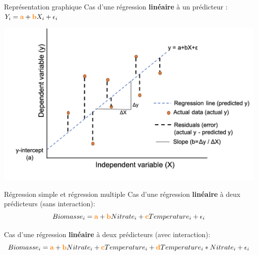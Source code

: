 	
	\begin{frame}{Représentation graphique}
	Cas d'une régression \textbf{linéaire} à un prédicteur : $Y_i = \textcolor{orange}{\textbf{a}} + \textcolor{orange}{\textbf{b}}X_i + \epsilon_i$
	
	\vspace{0.5cm}
	\includegraphics[scale=0.275]{Figures/Intro/regressionLine.png}
	\end{frame}
	
	
	\begin{frame}{Régression simple et régression multiple}
    	Cas d'une régression \textbf{linéaire} à deux prédicteurs (sans interaction): 
    	\begin{equation*}
    	    Biomasse_i = \textcolor{orange}{\textbf{a}} + \textcolor{orange}{\textbf{b}}Nitrate_i +\textcolor{orange}{\textbf{c}}Temperature_i + \epsilon_i
    	\end{equation*}
    	
    	\vspace{1cm}
    	
    	Cas d'une régression \textbf{linéaire} à deux prédicteurs (avec interaction): 
    	\begin{equation*}
    	    Biomasse_i = \textcolor{orange}{\textbf{a}} + \textcolor{orange}{\textbf{b}}Nitrate_i +\textcolor{orange}{\textbf{c}}Temperature_i + \textcolor{orange}{\textbf{d}}Temperature_i*Nitrate_i + \epsilon_i
    	\end{equation*}
    	
    	
    	
	\end{frame}
	
